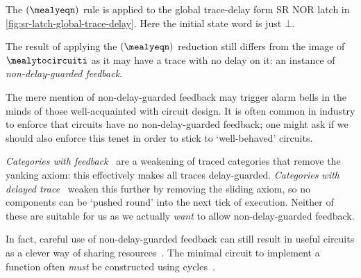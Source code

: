 \documentclass{lmcs}
\begin{document}
\begin{exa}
    The \((\mealyeqn)\) rule is applied to the global trace-delay form
    SR NOR latch in \autoref{fig:sr-latch-global-trace-delay}.
    Here the initial state word is just \(\bot\).
\end{exa}

The result of applying the \((\mealyeqn)\) reduction still differs from the
image of \(\mealytocircuiti\) as it may have a trace with no delay on it: an
instance of \emph{non-delay-guarded feedback}.

The mere mention of non-delay-guarded feedback may trigger alarm bells in
the minds of those well-acquainted with circuit design.
It is often common in industry to enforce that circuits have no
non-delay-guarded feedback; one might ask if we should also enforce this
tenet in order to stick to `well-behaved' circuits.

\begin{rem}
    \emph{Categories with feedback}~\cite{katis2002feedback} are a weakening of
    traced categories that remove the yanking axiom: this effectively makes all
    traces delay-guarded.
    \emph{Categories with delayed trace}~\cite{sprunger2019differentiable}
    weaken this further by removing the sliding axiom, so no components can be
    `pushed round' into the next tick of execution.
    Neither of these are suitable for us as we actually \emph{want} to allow
    non-delay-guarded feedback.
\end{rem}

In fact, careful use of non-delay-guarded feedback can still result in useful
circuits as a clever way of sharing
resources~\cite{malik1994analysis,riedel2004cyclic,mendler2012constructive}.
The minimal circuit to implement a function often \emph{must} be
constructed using cycles~\cite{rivest1977necessity,riedel2003synthesis}.
\end{document}
